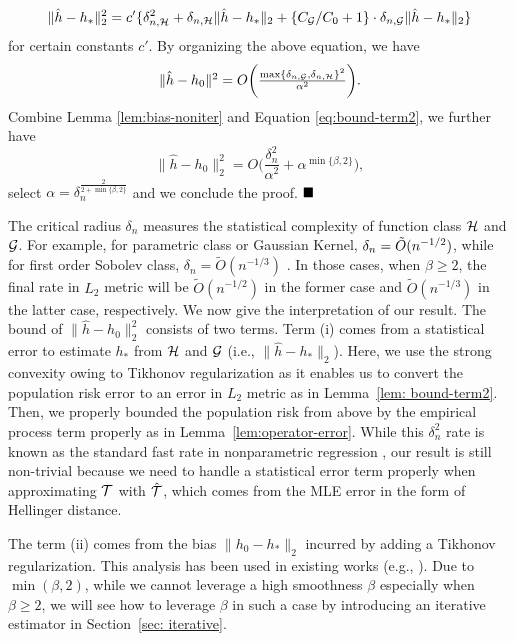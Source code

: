 \begin{align*}
     \|\hat h - h_* \|^2_2=c'\{\delta_{n,\mathcal{H}}^2 + \delta_{n,\mathcal{H}}\|\hat{h} - h_*\|_2  + \{C_{\mathcal{G}}/C_0+1\}\cdot \delta_{n,\mathcal{G}} \|\hat{h} - h_*\|_2 \} 
\end{align*}
for certain constants $c'$. 
By organizing the above equation, we have \begin{align}\label{eq:bound-term2}
\textstyle  \|\hat{h} - h_0\|^2 = O\bigg(\frac{\max\{\delta_{n,\mathcal{G}}, \delta_{n,\mathcal{H}}\}^2}{\alpha^2}\bigg).
\end{align}
Combine Lemma \ref{lem:bias-noniter} and Equation \eqref{eq:bound-term2}, we further have $$ \textstyle 
\|\hat h - h_0\|_2^2 = O\bigg(\frac{\delta_n^2}{\alpha^2} + \alpha^{\min\{\beta,2\}}\bigg),
$$
select $\alpha = \delta_n^{\frac{2}{2 + \min\{\beta, 2\}}}$ and we conclude the proof. $\QEDA$
    
The critical radius $\delta_n$ measures the statistical complexity of function class $\mathcal{H}$ and $\mathcal{G}$. For example, for parametric class or Gaussian Kernel, $\delta_n =\Tilde{O}(n^{-1/2})$, while for first order Sobolev class, $\delta_n = \tilde{O}(n^{-1/3})$ \citep{wainwright2019high, bartlett2002localized}. In those cases, when $\beta \geq 2$, the final rate in $L_2$ metric will be $\tilde{O}(n^{-1/2})$ in the former case and $\tilde{O}(n^{-1/3})$ in the latter case, respectively. 
We now give the interpretation of our result. The bound of $\|\hat{h} - h_0\|_2^2$ consists of two terms. Term (i) comes from a statistical error to estimate $h_{*}$ from $\mathcal{H}$ and $\mathcal{G}$ (i.e., $\|\hat h- h_{*}\|_2$). Here, we use the strong convexity owing to Tikhonov regularization as it enables us to convert the population risk error to an error in $L_2$ metric as in Lemma~\ref{lem: bound-term2}. Then, we properly bounded the population risk from above  by the empirical process term properly as in Lemma~\ref{lem:operator-error}. While this $\delta^2_n$ rate is known as the standard fast rate in nonparametric regression \citep{wainwright2019high}, our result is still non-trivial because we need to handle a statistical error term properly when approximating ${\mathcal{T}}$ with $\hat {{\mathcal{T}}}$, which comes from the MLE error in the form of Hellinger distance. 

The term (ii) comes from the bias $\|h_0- h_{*}\|_2$ incurred by adding a Tikhonov regularization. This analysis has been used in existing works (e.g., \citep{cavalier2011inverse}). Due to $\min(\beta,2)$, while we cannot leverage a high smoothness $\beta$ especially when $\beta \geq 2$, we will see how to leverage $\beta$ in such a case by introducing an iterative estimator in Section~\ref{sec: iterative}. 


